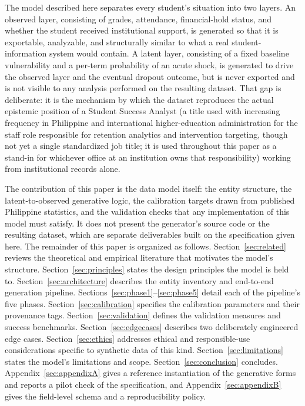 \documentclass[11pt]{article}
\begin{document}
The model described here separates every student's situation into two layers. An observed layer, consisting of grades, attendance, financial-hold status, and whether the student received institutional support, is generated so that it is exportable, analyzable, and structurally similar to what a real student-information system would contain. A latent layer, consisting of a fixed baseline vulnerability and a per-term probability of an acute shock, is generated to drive the observed layer and the eventual dropout outcome, but is never exported and is not visible to any analysis performed on the resulting dataset. That gap is deliberate: it is the mechanism by which the dataset reproduces the actual epistemic position of a Student Success Analyst (a title used with increasing frequency in Philippine and international higher-education administration for the staff role responsible for retention analytics and intervention targeting, though not yet a single standardized job title; it is used throughout this paper as a stand-in for whichever office at an institution owns that responsibility) working from institutional records alone.

The contribution of this paper is the data model itself: the entity structure, the latent-to-observed generative logic, the calibration targets drawn from published Philippine statistics, and the validation checks that any implementation of this model must satisfy. It does not present the generator's source code or the resulting dataset, which are separate deliverables built on the specification given here. The remainder of this paper is organized as follows. Section~\ref{sec:related} reviews the theoretical and empirical literature that motivates the model's structure. Section~\ref{sec:principles} states the design principles the model is held to. Section~\ref{sec:architecture} describes the entity inventory and end-to-end generation pipeline. Sections~\ref{sec:phase1}--\ref{sec:phase5} detail each of the pipeline's five phases. Section~\ref{sec:calibration} specifies the calibration parameters and their provenance tags. Section~\ref{sec:validation} defines the validation measures and success benchmarks. Section~\ref{sec:edgecases} describes two deliberately engineered edge cases. Section~\ref{sec:ethics} addresses ethical and responsible-use considerations specific to synthetic data of this kind. Section~\ref{sec:limitations} states the model's limitations and scope. Section~\ref{sec:conclusion} concludes. Appendix~\ref{sec:appendixA} gives a reference instantiation of the generative forms and reports a pilot check of the specification, and Appendix~\ref{sec:appendixB} gives the field-level schema and a reproducibility policy.
\end{document}
